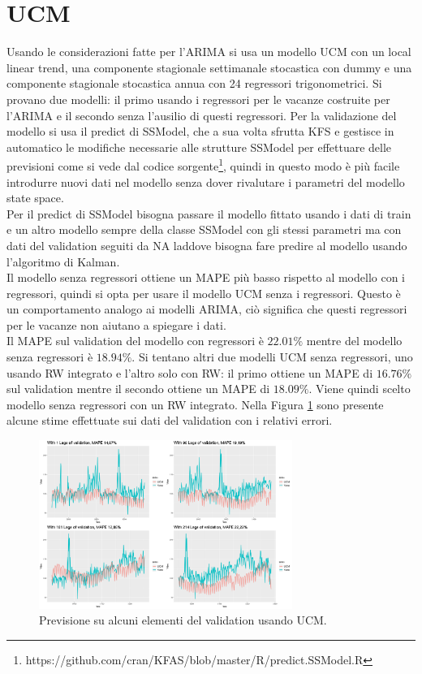 \documentclass[12pt, onecolumn]{article}
\begin{document}
\section*{UCM}
Usando le considerazioni fatte per l'ARIMA si usa un modello UCM con un local linear trend, una componente stagionale settimanale stocastica con dummy e una componente stagionale stocastica annua con 24 regressori trigonometrici.
Si provano due modelli: il primo usando i regressori per le vacanze costruite per l'ARIMA e il secondo senza l'ausilio di questi regressori.
Per la validazione del modello si usa il predict di SSModel, che a sua volta sfrutta KFS e gestisce in automatico le modifiche necessarie alle strutture SSModel per effettuare delle previsioni come si vede dal codice sorgente\footnote{https://github.com/cran/KFAS/blob/master/R/predict.SSModel.R}, quindi in questo modo è più facile introdurre nuovi dati nel modello senza dover rivalutare i parametri del modello state space.\\
Per il predict di SSModel bisogna passare il modello fittato usando i dati di train e un altro modello sempre della classe SSModel con gli stessi parametri ma con dati del validation seguiti da NA laddove bisogna fare predire al modello usando l'algoritmo di Kalman.\\
Il modello senza regressori ottiene un MAPE più basso rispetto al modello con i regressori, quindi si opta per usare il modello UCM senza i regressori.
Questo è un comportamento analogo ai modelli ARIMA, ciò significa che questi regressori per le vacanze non aiutano a spiegare i dati.\\
Il MAPE sul validation del modello con regressori è $22.01\%$ mentre del modello senza regressori è $18.94\%$.
Si tentano altri due modelli UCM senza regressori, uno usando RW integrato e l'altro solo con RW: il primo ottiene un MAPE di $16.76\%$sul validation mentre il secondo ottiene un MAPE di $18.09\%$.
Viene quindi scelto modello senza regressori con un RW integrato.
Nella Figura \ref{fig:UCM_pred} sono presente alcune stime effettuate sui dati del validation con i relativi errori.
\begin{figure}[!h]
  \centering
  \includegraphics[width=\linewidth,height=5.5cm]{imgs/forecast_ucm.png}
  \caption{Previsione su alcuni elementi del validation usando UCM.}
  \label{fig:UCM_pred}
\end{figure}
\end{document}
